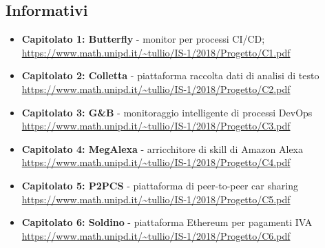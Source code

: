 \subsection{Informativi}
\begin{itemize}
\item \textbf{Capitolato 1: Butterfly} - monitor per processi CI/CD;\\
\url{https://www.math.unipd.it/~tullio/IS-1/2018/Progetto/C1.pdf}

\item \textbf{Capitolato 2: Colletta} - piattaforma raccolta dati di analisi di testo\\
\url{https://www.math.unipd.it/~tullio/IS-1/2018/Progetto/C2.pdf}
\item \textbf{Capitolato 3: G\&B} - monitoraggio intelligente di processi DevOps\\
\url{https://www.math.unipd.it/~tullio/IS-1/2018/Progetto/C3.pdf}
\item \textbf{Capitolato 4: MegAlexa} - arricchitore di skill di Amazon Alexa\\
\url{https://www.math.unipd.it/~tullio/IS-1/2018/Progetto/C4.pdf}
\item \textbf{Capitolato 5: P2PCS} - piattaforma di peer-to-peer car sharing\\
\url{https://www.math.unipd.it/~tullio/IS-1/2018/Progetto/C5.pdf}
\item \textbf{Capitolato 6: Soldino} - piattaforma Ethereum per pagamenti IVA\\
\url{https://www.math.unipd.it/~tullio/IS-1/2018/Progetto/C6.pdf}

\end{itemize}
